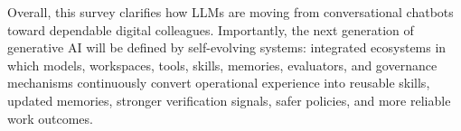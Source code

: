 Overall, this survey clarifies how LLMs are moving from conversational chatbots toward dependable digital colleagues. Importantly, the next generation of generative AI will be defined by self-evolving systems: integrated ecosystems in which models, workspaces, tools, skills, memories, evaluators, and governance mechanisms continuously convert operational experience into reusable skills, updated memories, stronger verification signals, safer policies, and more reliable work outcomes.
